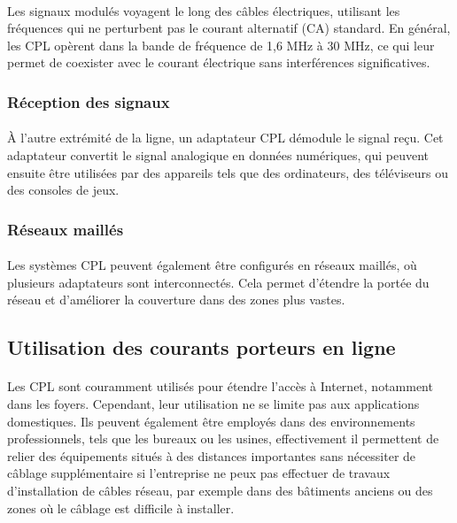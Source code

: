 \documentclass[a4paper,twocolumn]{report}
\begin{document}
\paragraph{} Les signaux modulés voyagent le long des câbles électriques,
utilisant les fréquences qui ne perturbent pas le courant alternatif (CA) standard.
En général, les CPL opèrent dans la bande de fréquence de 1,6 MHz à 30 MHz,
ce qui leur permet de coexister avec le courant électrique sans interférences significatives.

\subsubsection{Réception des signaux}
\paragraph{} À l'autre extrémité de la ligne, un adaptateur CPL démodule le signal reçu.
Cet adaptateur convertit le signal analogique en données numériques,
qui peuvent ensuite être utilisées par des appareils tels que des ordinateurs,
des téléviseurs ou des consoles de jeux.

\subsubsection{Réseaux maillés}
\paragraph{} Les systèmes CPL peuvent également être configurés en réseaux maillés,
où plusieurs adaptateurs sont interconnectés. Cela permet d'étendre la portée du réseau
et d'améliorer la couverture dans des zones plus vastes.

\subsection{Utilisation des courants porteurs en ligne}
\paragraph{} Les CPL sont couramment utilisés pour étendre l'accès à Internet, notamment dans les foyers. Cependant, leur utilisation ne se limite pas aux applications domestiques. Ils peuvent également être employés dans des environnements professionnels, tels que les bureaux ou les usines, effectivement il permettent de relier des équipements situés à des distances importantes sans nécessiter de câblage supplémentaire si l'entreprise ne peux pas effectuer de travaux d'installation de câbles réseau, par exemple dans des bâtiments anciens ou des zones où le câblage est difficile à installer.
\end{document}
